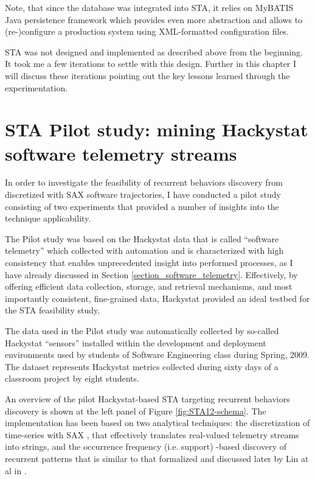 Note, that since the database was integrated into STA, it relies on MyBATIS Java persistence framework which provides even more
abstraction and allows to (re-)configure a production system using XML-formatted configuration files.

STA was not designed and implemented as described above from the beginning. It took me a few iterations to settle with this design.
Further in this chapter I will discuss these iterations pointing out the key lessons learned through the experimentation.

\section{STA Pilot study: mining Hackystat software telemetry streams}
In order to investigate the feasibility of recurrent behaviors discovery from discretized with 
SAX \cite{citeulike:2821475} software trajectories, I have conducted a pilot study consisting of two experiments that provided a number 
of insights into the technique applicability.  

The Pilot study was based on the Hackystat data that is called ``software telemetry'' \cite{citeulike:12929227} which collected with 
automation and is characterized with high consistency that enables unprecedented insight into performed processes, 
as I have already discussed in Section \ref{section_software_telemetry}. 
Effectively, by offering efficient data collection, storage, and retrieval mechanisms, and most importantly consistent, fine-grained data, 
Hackystat provided an ideal testbed for the STA feasibility study.

The data used in the Pilot study was automatically collected by so-called Hackystat ``sensors'' installed within the development and 
deployment environments used by students of Software Engineering class during Spring, 2009. 
The dataset represents Hackystat metrics collected during sixty days of a classroom project by eight students. 

An overview of the pilot Hackystat-based STA targeting recurrent behaviors discovery is shown at the left panel of Figure  
\ref{fig:STA12-schema}. The implementation has been based on two analytical techniques: the discretization of time-series with 
SAX \cite{sax}, that effectively translates real-valued telemetry streams into strings, and the occurrence frequency (i.e. support) -based 
discovery of recurrent patterns that is similar to that formalized and discussed later by Lin at al in \cite{citeulike:10525778}. 

